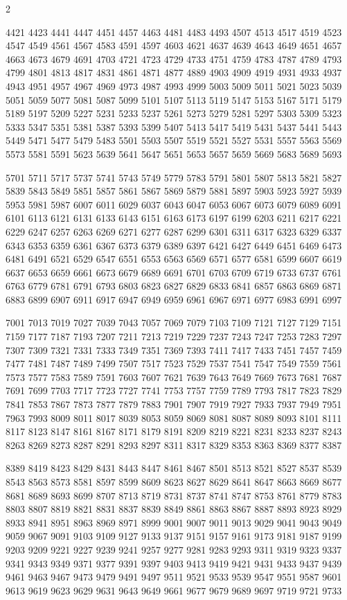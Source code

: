 \documentclass{article}
\begin{document}
\begin{multicols}{2}
\vfill

4421
4423
4441
4447
4451
4457
4463
4481
4483
4493
4507
4513
4517
4519
4523
4547
4549
4561
4567
4583
4591
4597
4603
4621
4637
4639
4643
4649
4651
4657
4663
4673
4679
4691
4703
4721
4723
4729
4733
4751
4759
4783
4787
4789
4793
4799
4801
4813
4817
4831
4861
4871
4877
4889
4903
4909
4919
4931
4933
4937
4943
4951
4957
4967
4969
4973
4987
4993
4999
5003
5009
5011
5021
5023
5039
5051
5059
5077
5081
5087
5099
5101
5107
5113
5119
5147
5153
5167
5171
5179
5189
5197
5209
5227
5231
5233
5237
5261
5273
5279
5281
5297
5303
5309
5323
5333
5347
5351
5381
5387
5393
5399
5407
5413
5417
5419
5431
5437
5441
5443
5449
5471
5477
5479
5483
5501
5503
5507
5519
5521
5527
5531
5557
5563
5569
5573
5581
5591
5623
5639
5641
5647
5651
5653
5657
5659
5669
5683
5689
5693

\vfill

5701
5711
5717
5737
5741
5743
5749
5779
5783
5791
5801
5807
5813
5821
5827
5839
5843
5849
5851
5857
5861
5867
5869
5879
5881
5897
5903
5923
5927
5939
5953
5981
5987
6007
6011
6029
6037
6043
6047
6053
6067
6073
6079
6089
6091
6101
6113
6121
6131
6133
6143
6151
6163
6173
6197
6199
6203
6211
6217
6221
6229
6247
6257
6263
6269
6271
6277
6287
6299
6301
6311
6317
6323
6329
6337
6343
6353
6359
6361
6367
6373
6379
6389
6397
6421
6427
6449
6451
6469
6473
6481
6491
6521
6529
6547
6551
6553
6563
6569
6571
6577
6581
6599
6607
6619
6637
6653
6659
6661
6673
6679
6689
6691
6701
6703
6709
6719
6733
6737
6761
6763
6779
6781
6791
6793
6803
6823
6827
6829
6833
6841
6857
6863
6869
6871
6883
6899
6907
6911
6917
6947
6949
6959
6961
6967
6971
6977
6983
6991
6997

\vfill

7001
7013
7019
7027
7039
7043
7057
7069
7079
7103
7109
7121
7127
7129
7151
7159
7177
7187
7193
7207
7211
7213
7219
7229
7237
7243
7247
7253
7283
7297
7307
7309
7321
7331
7333
7349
7351
7369
7393
7411
7417
7433
7451
7457
7459
7477
7481
7487
7489
7499
7507
7517
7523
7529
7537
7541
7547
7549
7559
7561
7573
7577
7583
7589
7591
7603
7607
7621
7639
7643
7649
7669
7673
7681
7687
7691
7699
7703
7717
7723
7727
7741
7753
7757
7759
7789
7793
7817
7823
7829
7841
7853
7867
7873
7877
7879
7883
7901
7907
7919
7927
7933
7937
7949
7951
7963
7993
8009
8011
8017
8039
8053
8059
8069
8081
8087
8089
8093
8101
8111
8117
8123
8147
8161
8167
8171
8179
8191
8209
8219
8221
8231
8233
8237
8243
8263
8269
8273
8287
8291
8293
8297
8311
8317
8329
8353
8363
8369
8377
8387

\vfill

8389
8419
8423
8429
8431
8443
8447
8461
8467
8501
8513
8521
8527
8537
8539
8543
8563
8573
8581
8597
8599
8609
8623
8627
8629
8641
8647
8663
8669
8677
8681
8689
8693
8699
8707
8713
8719
8731
8737
8741
8747
8753
8761
8779
8783
8803
8807
8819
8821
8831
8837
8839
8849
8861
8863
8867
8887
8893
8923
8929
8933
8941
8951
8963
8969
8971
8999
9001
9007
9011
9013
9029
9041
9043
9049
9059
9067
9091
9103
9109
9127
9133
9137
9151
9157
9161
9173
9181
9187
9199
9203
9209
9221
9227
9239
9241
9257
9277
9281
9283
9293
9311
9319
9323
9337
9341
9343
9349
9371
9377
9391
9397
9403
9413
9419
9421
9431
9433
9437
9439
9461
9463
9467
9473
9479
9491
9497
9511
9521
9533
9539
9547
9551
9587
9601
9613
9619
9623
9629
9631
9643
9649
9661
9677
9679
9689
9697
9719
9721
9733


\end{multicols}
\end{document}
